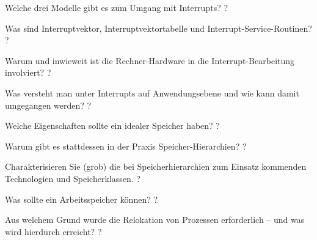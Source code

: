 \documentclass[avery5371]{flashcards}
\begin{document}
\begin{flashcard}{Welche drei Modelle gibt es zum Umgang mit Interrupts?}
    ?
\end{flashcard}

\begin{flashcard}{Was sind Interruptvektor, Interruptvektortabelle und Interrupt-Service-Routinen?}
    ?
\end{flashcard}

\begin{flashcard}{Warum und inwieweit ist die Rechner-Hardware in die Interrupt-Bearbeitung involviert?}
    ?
\end{flashcard}

\begin{flashcard}{Was versteht man unter Interrupts auf Anwendungsebene und wie kann damit umgegangen werden?}
    ?
\end{flashcard}

\begin{flashcard}[Speichermanagement]{Welche Eigenschaften sollte ein idealer Speicher haben?}
    ?
\end{flashcard}

\begin{flashcard}[Speichermanagement]{Warum gibt es stattdessen in der Praxis Speicher-Hierarchien?}
    ?
\end{flashcard}

\begin{flashcard}[Speichermanagement]{Charakterisieren Sie (grob) die bei Speicherhierarchien zum Einsatz kommenden Technologien und Speicherklassen.}
    ?
\end{flashcard}

\begin{flashcard}[Speichermanagement]{Was sollte ein Arbeitsspeicher können?}
    ?
\end{flashcard}

\begin{flashcard}[Speichermanagement]{Aus welchem Grund wurde die Relokation von Prozessen erforderlich – und was wird hierdurch erreicht?}
    ?
\end{flashcard}
\end{document}

